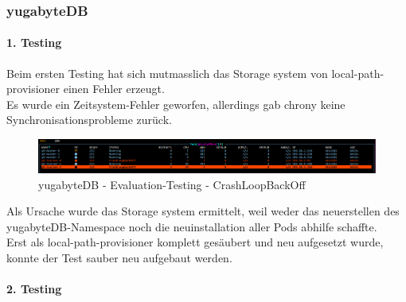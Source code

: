 
\subsubsection{yugabyteDB}
\begin{flushleft}
    \paragraph{1. Testing}
    Beim ersten Testing hat sich mutmasslich das Storage system von \gls{local-path-provisioner} einen Fehler erzeugt.\\
    Es wurde ein Zeitsystem-Fehler geworfen, allerdings gab \gls{chrony} keine Synchronisationsprobleme zurück.\\
    \begin{figure}[H]
        \centering
        \includegraphics[width=0.8\linewidth]{source/implementation/evaluation/evaluation_tests/storage_errors/k8s_crashloopback}
        \caption{yugabyteDB - Evaluation-Testing - CrashLoopBackOff}
        \label{fig:k8s_crashloopback}
    \end{figure}
\end{flushleft}
\begin{flushleft}
    Als Ursache wurde das Storage system ermittelt, weil weder das neuerstellen des yugabyteDB-Namespace noch die  neuinstallation aller Pods abhilfe schaffte.\\
    Erst als \gls{local-path-provisioner} komplett gesäubert und neu aufgesetzt wurde, konnte der Test sauber neu aufgebaut werden.
\end{flushleft}
\paragraph{2. Testing}

